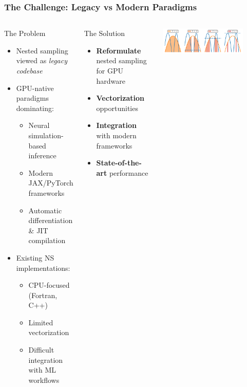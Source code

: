 \documentclass[aspectratio=169]{beamer}
\begin{document}
\begin{frame}
    \frametitle{The Challenge: Legacy vs Modern Paradigms}
    \begin{columns}
        \begin{block}{The Problem}
            \begin{itemize}
                \item Nested sampling viewed as \emph{legacy codebase}
                \item GPU-native paradigms dominating:
                    \begin{itemize}
                        \item Neural simulation-based inference
                        \item Modern JAX/PyTorch frameworks
                        \item Automatic differentiation \& JIT compilation
                    \end{itemize}
                \item Existing NS implementations:
                    \begin{itemize}
                        \item CPU-focused (Fortran, C++)
                        \item Limited vectorization
                        \item Difficult integration with ML workflows
                    \end{itemize}
            \end{itemize}
        \end{block}
        \begin{block}{The Solution}
            \begin{itemize}
                \item \textbf{Reformulate} nested sampling for GPU hardware
                \item \textbf{Vectorization} opportunities
                \item \textbf{Integration} with modern frameworks
                \item \textbf{State-of-the-art} performance
            \end{itemize}
        \end{block}
        \vspace{10pt}
        \centerline{\includegraphics[width=0.8\textwidth]{figures/ns_diagram}}
    \end{columns}
\end{frame}
\end{document}
